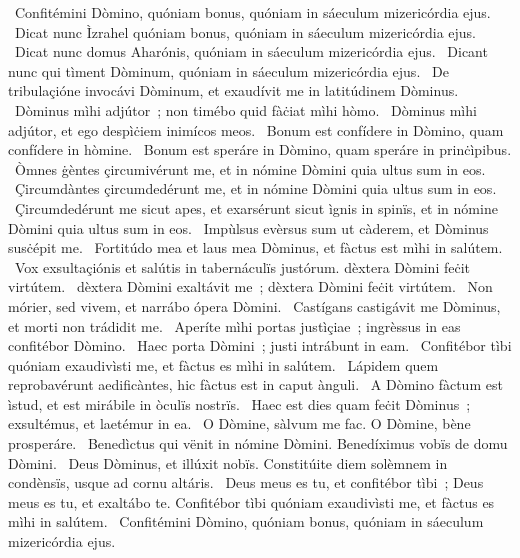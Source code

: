 ~Confitémini Dòmino, quóniam bonus, quóniam in sáeculum mizericórdia ejus. 
~Dicat nunc Ìzrahel quóniam bonus, quóniam in sáeculum mizericórdia ejus. 
~Dicat nunc domus Aharónis, quóniam in sáeculum mizericórdia ejus. 
~Dicant nunc qui tìment Dòminum, quóniam in sáeculum mizericórdia ejus. 
~De tribulaçióne invocávi Dòminum, et exaudívit me in latitúdinem Dòminus. 
~Dòminus mìhi adjútor~; non timébo quid fàċiat mìhi hòmo. 
~Dòminus mìhi adjútor, et ego despìċiem inimícos meos. 
~Bonum est confídere in Dòmino, quam confídere in hòmine. 
~Bonum est speráre in Dòmino, quam speráre in prinċìpibus. 
~Òmnes ġèntes çircumivérunt me, et in nómine Dòmini quia ultus sum in eos. 
~Çircumdàntes çircumdedérunt me, et in nómine Dòmini quia ultus sum in eos. 
~Çircumdedérunt me sicut apes, et exarsérunt sicut ìgnis in spinïs, et in nómine Dòmini quia ultus sum in eos. 
~Impùlsus evèrsus sum ut càderem, et Dòminus susċépit me. 
~Fortitúdo mea et laus mea Dòminus, et fàctus est mìhi in salútem. 
~Vox exsultaçiónis et salútis in tabernáculïs justórum. dèxtera Dòmini feċit virtútem. 
~dèxtera Dòmini exaltávit me~; dèxtera Dòmini feċit virtútem. 
~Non mórier, sed vivem, et narrábo ópera Dòmini. 
~Castígans castigávit me Dòminus, et morti non trádidit me. 
~Aperíte mìhi portas justìçiae~; ingrèssus in eas confitébor Dòmino. 
~Haec porta Dòmini~; justi intrábunt in eam. 
~Confitébor tìbi quóniam exaudivìsti me, et fàctus es mìhi in salútem. 
~Lápidem quem reprobavérunt aedificàntes, hic fàctus est in caput ànguli. 
~A Dòmino fàctum est ìstud, et est mirábile in òculïs nostrïs. 
~Haec est dies quam feċit Dòminus~; exsultémus, et laetémur in ea. 
~O Dòmine, sàlvum me fac. O Dòmine, bène prosperáre. 
~Benedìctus qui vënit in nómine Dòmini. Benedíximus vobïs de domu Dòmini. 
~Deus Dòminus, et illúxit nobïs. Constitúite diem solèmnem in condènsïs, usque ad cornu altáris. 
~Deus meus es tu, et confitébor tìbi~; Deus meus es tu, et exaltábo te. Confitébor tìbi quóniam exaudivìsti me, et fàctus es mìhi in salútem. 
~Confitémini Dòmino, quóniam bonus, quóniam in sáeculum mizericórdia ejus. 
